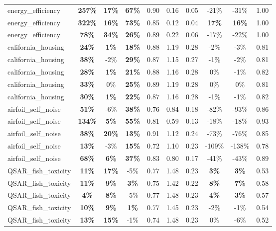 \begin{table}[!htbp]
\begin{small}
\begin{sc}
{\begin{tabular}{lccccccccc}
energy\_efficiency & \textbf{257\%} & \textbf{17\%} & \textbf{67\%} & 0.90 & 0.16 & 0.05 & -21\% & -31\% & 1.00 \\
energy\_efficiency & \textbf{322\%} & \textbf{16\%} & \textbf{73\%} & 0.85 & 0.12 & 0.04 & \textbf{17\%} & \textbf{16\%} & 1.00 \\
energy\_efficiency & \textbf{78\%} & \textbf{34\%} & \textbf{26\%} & 0.89 & 0.22 & 0.06 & -17\% & -22\% & 1.00 \\
california\_housing & \textbf{24\%} & \textbf{1\%} & \textbf{18\%} & 0.88 & 1.19 & 0.28 & -2\% & -3\% & 0.81 \\
california\_housing & \textbf{38\%} & -2\% & \textbf{29\%} & 0.87 & 1.15 & 0.27 & -1\% & -2\% & 0.81 \\
california\_housing & \textbf{28\%} & \textbf{1\%} & \textbf{21\%} & 0.88 & 1.16 & 0.28 & 0\% & -1\% & 0.82 \\
california\_housing & \textbf{33\%} & 0\% & \textbf{25\%} & 0.89 & 1.19 & 0.28 & 0\% & 0\% & 0.81 \\
california\_housing & \textbf{30\%} & \textbf{1\%} & \textbf{22\%} & 0.87 & 1.16 & 0.28 & -1\% & -1\% & 0.82 \\
airfoil\_self\_noise & \textbf{51\%} & -6\% & \textbf{38\%} & 0.76 & 0.84 & 0.18 & -82\% & -93\% & 0.86 \\
airfoil\_self\_noise & \textbf{134\%} & \textbf{5\%} & \textbf{55\%} & 0.81 & 0.59 & 0.13 & -18\% & -18\% & 0.93 \\
airfoil\_self\_noise & \textbf{38\%} & \textbf{20\%} & \textbf{13\%} & 0.91 & 1.12 & 0.24 & -73\% & -76\% & 0.85 \\
airfoil\_self\_noise & \textbf{13\%} & -3\% & \textbf{15\%} & 0.72 & 1.10 & 0.23 & -109\% & -138\% & 0.78 \\
airfoil\_self\_noise & \textbf{68\%} & \textbf{6\%} & \textbf{37\%} & 0.83 & 0.80 & 0.17 & -41\% & -43\% & 0.89 \\
QSAR\_fish\_toxicity & \textbf{11\%} & \textbf{17\%} & -5\% & 0.77 & 1.48 & 0.23 & \textbf{3\%} & \textbf{3\%} & 0.53 \\
QSAR\_fish\_toxicity & \textbf{11\%} & \textbf{9\%} & \textbf{3\%} & 0.75 & 1.42 & 0.22 & \textbf{8\%} & \textbf{7\%} & 0.58 \\
QSAR\_fish\_toxicity & \textbf{4\%} & \textbf{8\%} & -5\% & 0.77 & 1.48 & 0.23 & \textbf{4\%} & \textbf{3\%} & 0.57 \\
QSAR\_fish\_toxicity & \textbf{10\%} & \textbf{9\%} & \textbf{1\%} & 0.77 & 1.45 & 0.23 & -2\% & -1\% & 0.54 \\
QSAR\_fish\_toxicity & \textbf{13\%} & \textbf{15\%} & -1\% & 0.74 & 1.48 & 0.23 & 0\% & -6\% & 0.52 \\
\bottomrule
\end{tabular}
}
\end{sc}
\end{small}
\end{table}
